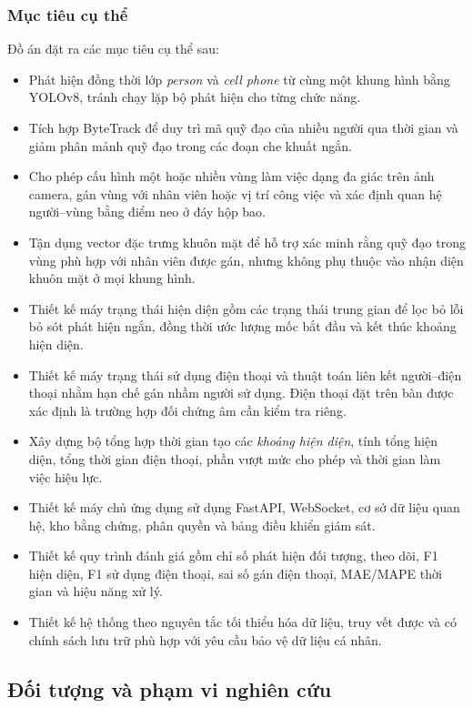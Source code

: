 \subsubsection{Mục tiêu cụ thể}
Đồ án đặt ra các mục tiêu cụ thể sau:
\begin{itemize}
\item Phát hiện đồng thời lớp \textit{person} và \textit{cell phone} từ cùng một khung hình bằng YOLOv8, tránh chạy lặp bộ phát hiện cho từng chức năng.
\item Tích hợp ByteTrack để duy trì mã quỹ đạo của nhiều người qua thời gian và giảm phân mảnh quỹ đạo trong các đoạn che khuất ngắn.
\item Cho phép cấu hình một hoặc nhiều vùng làm việc dạng đa giác trên ảnh camera, gán vùng với nhân viên hoặc vị trí công việc và xác định quan hệ người--vùng bằng điểm neo ở đáy hộp bao.
\item Tận dụng vector đặc trưng khuôn mặt để hỗ trợ xác minh rằng quỹ đạo trong vùng phù hợp với nhân viên được gán, nhưng không phụ thuộc vào nhận diện khuôn mặt ở mọi khung hình.
\item Thiết kế máy trạng thái hiện diện gồm các trạng thái trung gian để lọc bỏ lỗi bỏ sót phát hiện ngắn, đồng thời ước lượng mốc bắt đầu và kết thúc khoảng hiện diện.
\item Thiết kế máy trạng thái sử dụng điện thoại và thuật toán liên kết người--điện thoại nhằm hạn chế gán nhầm người sử dụng. Điện thoại đặt trên bàn được xác định là trường hợp đối chứng âm cần kiểm tra riêng.
\item Xây dựng bộ tổng hợp thời gian tạo các \textit{khoảng hiện diện}, tính tổng hiện diện, tổng thời gian điện thoại, phần vượt mức cho phép và thời gian làm việc hiệu lực.
\item Thiết kế máy chủ ứng dụng sử dụng FastAPI, WebSocket, cơ sở dữ liệu quan hệ, kho bằng chứng, phân quyền và bảng điều khiển giám sát.
\item Thiết kế quy trình đánh giá gồm chỉ số phát hiện đối tượng, theo dõi, F1 hiện diện, F1 sử dụng điện thoại, sai số gán điện thoại, MAE/MAPE thời gian và hiệu năng xử lý.
\item Thiết kế hệ thống theo nguyên tắc tối thiểu hóa dữ liệu, truy vết được và có chính sách lưu trữ phù hợp với yêu cầu bảo vệ dữ liệu cá nhân.
\end{itemize}

\subsection{Đối tượng và phạm vi nghiên cứu}
